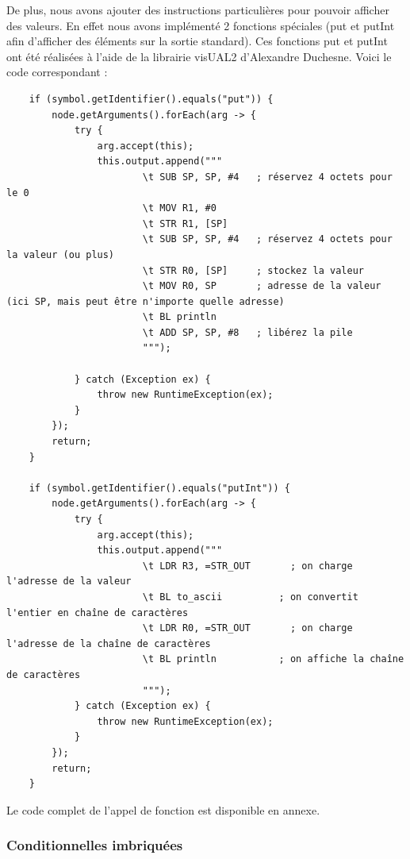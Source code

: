 \documentclass[french,a4paper]{article}
\begin{document}
    De plus, nous avons ajouter des instructions particulières pour pouvoir afficher des valeurs. En effet nous avons implémenté 2 fonctions spéciales (put et putInt afin d'afficher des éléments sur la sortie standard).  Ces fonctions put et putInt ont été réalisées à l'aide de la librairie visUAL2 d'Alexandre Duchesne. Voici le code correspondant :
    \begin{lstlisting}
    if (symbol.getIdentifier().equals("put")) {
        node.getArguments().forEach(arg -> {
            try {
                arg.accept(this);
                this.output.append("""
                        \t SUB SP, SP, #4   ; réservez 4 octets pour le 0
                        \t MOV R1, #0
                        \t STR R1, [SP]
                        \t SUB SP, SP, #4   ; réservez 4 octets pour la valeur (ou plus)
                        \t STR R0, [SP]     ; stockez la valeur
                        \t MOV R0, SP       ; adresse de la valeur (ici SP, mais peut être n'importe quelle adresse)
                        \t BL println
                        \t ADD SP, SP, #8   ; libérez la pile
                        """);

            } catch (Exception ex) {
                throw new RuntimeException(ex);
            }
        });
        return;
    }

    if (symbol.getIdentifier().equals("putInt")) {
        node.getArguments().forEach(arg -> {
            try {
                arg.accept(this);
                this.output.append("""
                        \t LDR R3, =STR_OUT       ; on charge l'adresse de la valeur
                        \t BL to_ascii          ; on convertit l'entier en chaîne de caractères
                        \t LDR R0, =STR_OUT       ; on charge l'adresse de la chaîne de caractères
                        \t BL println           ; on affiche la chaîne de caractères
                        """);
            } catch (Exception ex) {
                throw new RuntimeException(ex);
            }
        });
        return;
    }
    \end{lstlisting}

    Le code complet de l'appel de fonction est disponible en annexe.





    \subsubsection{Conditionnelles imbriquées}
\end{document}
